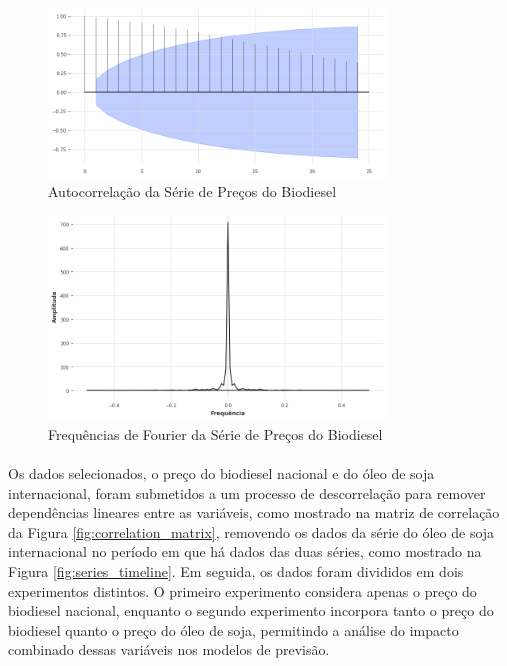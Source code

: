 \begin{figure}
	\begin{center}
		\begin{center}
			\includegraphics[width=0.8\textwidth]{figuras/acf_biodiesel.png}
			\caption{Autocorrelação da Série de Preços do Biodiesel}
			\label{fig:acf_biodiesel}
		\end{center}

	\end{center}
\end{figure}

\begin{figure}
	\begin{center}
		\begin{center}
			\includegraphics[width=0.8\textwidth]{figuras/fft_biodiesel.png}
			\caption{Frequências de Fourier da Série de Preços do Biodiesel}
			\label{fig:fft_biodiesel}
		\end{center}

	\end{center}
\end{figure}
\paragraph{} Os dados selecionados, o preço do biodiesel nacional e do óleo de soja internacional, foram submetidos a um processo de descorrelação para remover dependências lineares entre as variáveis, como mostrado na matriz de correlação da Figura \ref{fig:correlation_matrix}, removendo os dados da série do óleo de soja internacional no período em que há dados das duas séries, como mostrado na Figura \ref{fig:series_timeline}. Em seguida, os dados foram divididos em dois experimentos distintos. O primeiro experimento considera apenas o preço do biodiesel nacional, enquanto o segundo experimento incorpora tanto o preço do biodiesel quanto o preço do óleo de soja, permitindo a análise do impacto combinado dessas variáveis nos modelos de previsão.

